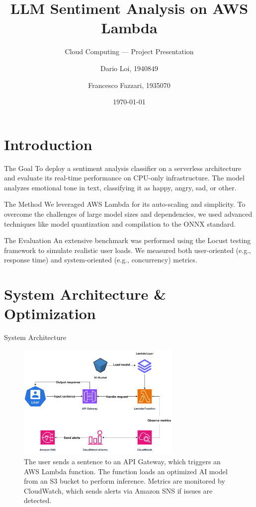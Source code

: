 \documentclass{beamer}
\title{LLM Sentiment Analysis on AWS Lambda} %
\subtitle{Cloud Computing --- Project Presentation} %
\author{Dario Loi, 1940849 \and Francesco Fazzari, 1935070} %
\institute{Sapienza, University of Rome} %
\date{\today}
\begin{document}
\begin{frame}
\titlepage%
\end{frame}


\section{Introduction}
\begin{frame}{The Goal}
    To deploy a sentiment analysis classifier on a serverless architecture and evaluate its real-time performance on CPU-only infrastructure. The model analyzes emotional tone in text, classifying it as happy, angry, sad, or other.
\end{frame}

\begin{frame}{The Method}
    We leveraged AWS Lambda for its auto-scaling and simplicity. To overcome the challenges of large model sizes and dependencies, we used advanced techniques like model quantization and compilation to the ONNX standard.
\end{frame}

\begin{frame}{The Evaluation}
    An extensive benchmark was performed using the Locust testing framework to simulate realistic user loads. We measured both user-oriented (e.g., response time) and system-oriented (e.g., concurrency) metrics.
\end{frame}

\section{System Architecture \& Optimization}
\begin{frame}{System Architecture}
    \begin{figure}[H]
        \centering
        \includegraphics[width=0.7\textwidth]{emo-diag.pdf}
        \caption{The user sends a sentence to an API Gateway, which triggers an AWS Lambda function. The function loads an optimized AI model from an S3 bucket to perform inference. Metrics are monitored by CloudWatch, which sends alerts via Amazon SNS if issues are detected.}
    \end{figure}
\end{frame}
\end{document}
